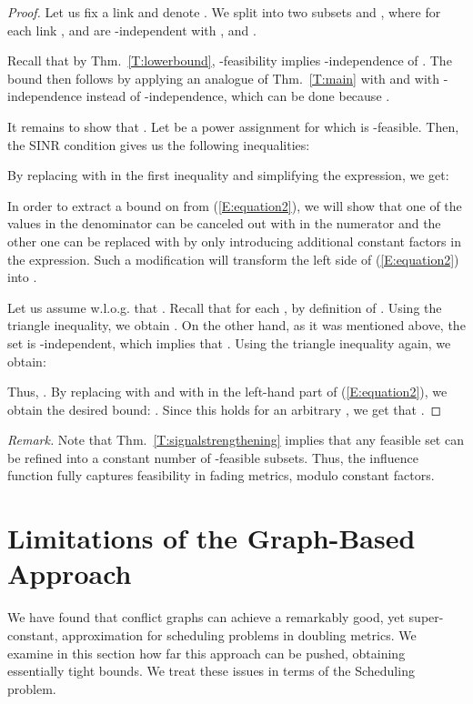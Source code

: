 \documentclass[11pt]{article}
\newcommand{\scheduling}{\textsf{Scheduling}}
\begin{document}
\begin{proof}
Let us fix a link  and denote .
We split  into two subsets  and , where for each link ,  and  are -independent with , and . 

Recall that by Thm.\ \ref{T:lowerbound}, -feasibility implies -independence of . The bound  then follows by applying an analogue of Thm.\ \ref{T:main} with  and with -independence instead of -independence, which can be done because .

It remains to show that . Let  be a power assignment for which  is -feasible.
Then, the SINR condition gives us the following inequalities:

 By replacing  with  in the first inequality and simplifying the expression, we get:

In order to extract a bound on  from (\ref{E:equation2}), we will show that one of the values  in the denominator can be canceled out with  in the numerator and the other one can be replaced with  by only introducing additional constant factors in the expression. Such a modification will transform the left side of (\ref{E:equation2}) into . 


Let us assume w.l.o.g. that . Recall that for each ,  by definition of . Using the triangle inequality, we obtain . On the other hand, as it was mentioned above, the set  is -independent, which implies that . Using the triangle inequality again, we obtain:

Thus, . By replacing  with  and  with  in the left-hand part of (\ref{E:equation2}), we obtain the desired bound: . Since this holds for an arbitrary , we get that . 
\end{proof}

\noindent \emph{Remark.}
Note that Thm.\ \ref{T:signalstrengthening} implies that any feasible set can be refined into a constant number of -feasible subsets. Thus, the influence function fully captures feasibility in fading metrics, modulo constant factors.



\section{Limitations of the Graph-Based Approach}\label{S:limitations}

We have found that conflict graphs can achieve a remarkably good, yet super-constant, approximation for scheduling problems in doubling metrics. We examine in this section how far this approach can be pushed, obtaining essentially tight bounds. We treat these issues in terms of the {\scheduling} problem.
\end{document}

